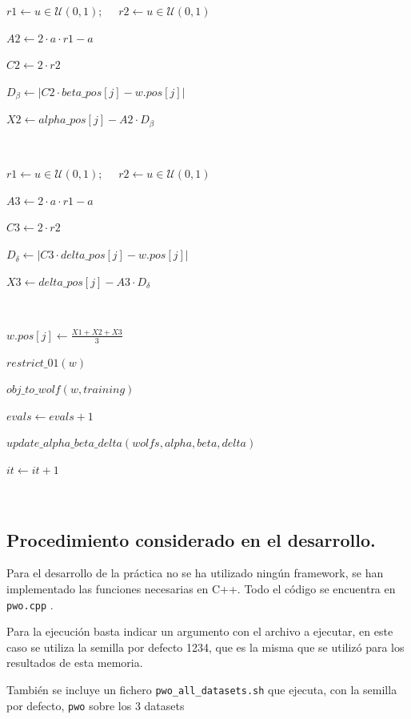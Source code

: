 \documentclass[11pt,a4paper]{article}
\theoremstyle{definition}
\begin{document}
\begin{algorithm}[H]
{{{{					$r1 \leftarrow u\in \mathcal{U}(0,1); \quad $					
					$r2 \leftarrow u\in \mathcal{U}(0,1)$
					
					$A2 \leftarrow 2 \cdot a \cdot r1 -a$
					
					$C2 \leftarrow 2 \cdot r2$
					
					$D_{\beta} \leftarrow | C2 \cdot beta\_pos[j] -w.pos[j] |$
					
					$X2 \leftarrow alpha\_pos[j] - A2 \cdot D_{\beta}$
					
					$ $					
					
					$r1 \leftarrow u\in \mathcal{U}(0,1);  \quad $					
					$r2 \leftarrow u\in \mathcal{U}(0,1)$
					
					$A3 \leftarrow 2 \cdot a \cdot r1 -a$
					
					$C3 \leftarrow 2 \cdot r2$
					
					$D_{\delta} \leftarrow | C3 \cdot delta\_pos[j] -w.pos[j] |$
					
					$X3 \leftarrow delta\_pos[j] - A3 \cdot D_{\delta}$
					
										$ $	
					
					$w.pos[j] \leftarrow \frac{X1+X2+X3}{3}$
				}
				
				$restrict\_01(w)$
						
				
				$obj\_to\_wolf(w, training)$
				
				$evals\leftarrow evals+1$
			}
			
		
		$update\_alpha\_beta\_delta(wolfs, alpha, beta, delta)$
		
		$it \leftarrow it+1$
	}
}
	\end{algorithm}~\\
	
		\subsection{Procedimiento considerado en el desarrollo.}
	Para el desarrollo de la práctica no se ha utilizado ningún framework, se han implementado las funciones necesarias en C++. Todo el código se encuentra en \texttt{pwo.cpp} .
	
	Para la ejecución basta indicar un argumento con el archivo a ejecutar, en este caso se utiliza la semilla por defecto 1234, que es la misma que se utilizó para los resultados de esta memoria.
	
	También se incluye un fichero \texttt{pwo\_all\_datasets.sh} que ejecuta, con la semilla por defecto, \texttt{pwo} sobre los 3 datasets
	
\end{document}
